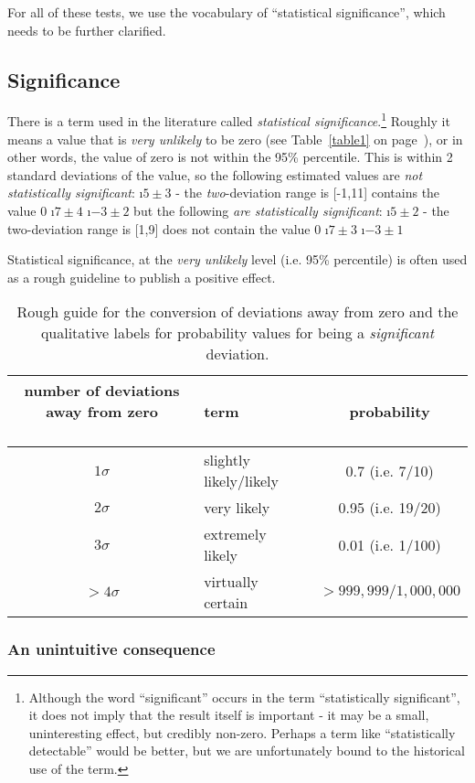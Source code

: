 For all of these tests, we use the vocabulary of ``statistical significance'', which needs to be further clarified.

\subsection{Significance}

There is a term used in the literature called {\em statistical significance}.\footnote{Although the word ``significant'' occurs in the term ``statistically significant'', it does not imply that the result itself is important - it may be a small, uninteresting effect, but credibly non-zero.  Perhaps a term like ``statistically detectable'' would be better, but we are unfortunately bound to the historical use of the term.}  Roughly it means a value that is \emph{very unlikely} to be zero (see Table~\ref{table1} on page~\pageref{table1}), or in other words, the value of zero is not within the 95\% percentile.  This is within 2 standard deviations of the value, so the following estimated values are {\em not statistically significant}:
\bi
\i $5\pm 3$ - the \emph{two}-deviation range is [-1,11] contains the value 0
\i $7\pm 4$
\i $-3 \pm 2$
\ei
but the following {\em are statistically significant}:
\bi
\i $5\pm 2$  - the two-deviation range is [1,9] does not contain the value 0
\i $7\pm 3$
\i $-3 \pm 1$
\ei

Statistical significance, at the \emph{very unlikely} level (i.e. 95\% percentile) is often used as a rough guideline to publish a positive effect.  
\begin{table}
\begin{tabular}{cp{1.3in}c}
\parbox{1in}{number of deviations away from zero\\ \ }& term & probability \\\hline\hline
$1\sigma$ & slightly likely/likely & 0.7 (i.e. 7/10) \\
$2\sigma$ & very likely & 0.95 (i.e. 19/20) \\
$3\sigma$ & extremely likely & 0.01 (i.e. 1/100) \\
$>4\sigma$ & virtually certain & $>999,999/1,000,000$
\end{tabular}
\label{tbl:norm likely}
\caption{Rough guide for the conversion of deviations away from zero and the  qualitative labels for probability values for being a \emph{significant} deviation.}
\end{table}


\subsubsection{An unintuitive consequence}

